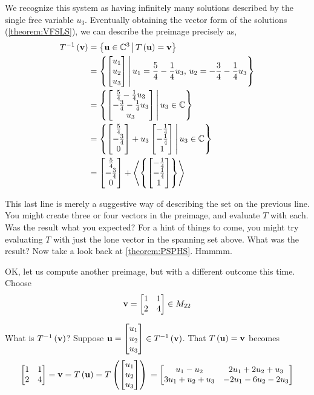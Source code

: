 \documentclass{ximera}
\begin{document}
\begin{example}
We recognize this system as having infinitely many solutions described by the single free variable $u_3$.  Eventually obtaining the vector form of the solutions (\ref{theorem:VFSLS}), we can describe the preimage precisely as,
\begin{align*}
T^{-1}\left(\mathbf{v}\right)&=\left\lbrace\mathbf{u}\in\mathbb{C}^{3}\,\middle|\,T\left(\mathbf{u}\right)=\mathbf{v}\right\rbrace\\
&=\left\lbrace\begin{bmatrix}u_1\\u_2\\u_3\end{bmatrix}\,\middle|\,u_1=\frac{5}{4}-\frac{1}{4}u_3,\,u_2=-\frac{3}{4}-\frac{1}{4}u_3\right\rbrace\\
&=\left\lbrace\begin{bmatrix}\frac{5}{4}-\frac{1}{4}u_3\\-\frac{3}{4}-\frac{1}{4}u_3\\u_3\end{bmatrix}\,\middle|\,u_3\in\mathbb{C}\right\rbrace\\
&=\left\lbrace\begin{bmatrix}\frac{5}{4}\\-\frac{3}{4}\\0\end{bmatrix}+u_3\begin{bmatrix}-\frac{1}{4}\\-\frac{1}{4}\\1\end{bmatrix}\,\middle|\,u_3\in\mathbb{C}\right\rbrace\\
&=\begin{bmatrix}\frac{5}{4}\\-\frac{3}{4}\\0\end{bmatrix}+\left\langle\left\{\begin{bmatrix}-\frac{1}{4}\\-\frac{1}{4}\\1\end{bmatrix}\right\}\right\rangle
\end{align*}

This last line is merely a suggestive way of describing the set on the previous line.  You might create three or four vectors in the preimage, and evaluate $T$ with each.  Was the result what you expected?  For a hint of things to come, you might try evaluating $T$ with just the lone vector in the spanning set above.  What was the result?  Now take a look back at \ref{theorem:PSPHS}.  Hmmmm.

OK, let us compute another preimage, but with a different outcome this time.
Choose
\[
\mathbf{v}=
\begin{bmatrix}
1&1\\2&4
\end{bmatrix}
\in M_{22}
\]




What is $T^{-1}\left(\mathbf{v}\right)$?  Suppose $\mathbf{u}=\begin{bmatrix}u_1\\u_2\\u_3\end{bmatrix}\in T^{-1}\left(\mathbf{v}\right)$.  That $T\left(\mathbf{u}\right)=\mathbf{v}$ becomes
\[
\begin{bmatrix}
1&1\\2&4
\end{bmatrix}
=\mathbf{v}
=T\left(\mathbf{u}\right)
=T\left(\begin{bmatrix}u_1\\u_2\\u_3\end{bmatrix}\right)\\
=\begin{bmatrix}
u_1-u_2&2u_1+2u_2+u_3\\
3u_1+u_2+u_3&-2u_1-6u_2-2u_3
\end{bmatrix}
\]


\end{example}
\end{document}
